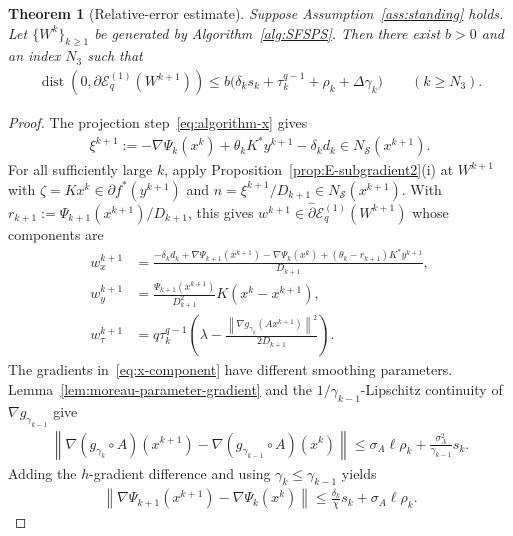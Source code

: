 \documentclass[9pt]{article}
\numberwithin{equation}{section}
\newtheorem{theorem}{Theorem}[section]
\theoremstyle{definition}
\theoremstyle{remark}
\newcommand{\Sset}{\mathcal S}
\newcommand{\whpartial}{\widehat\partial}
\newcommand{\norm}[1]{\left\lVert #1\right\rVert}
\newcommand{\Ecal}{\mathcal E}
\DeclareMathOperator{\dist}{dist}
\begin{document}
\begin{theorem}[Relative-error estimate]\label{lem:relative-error}
Suppose Assumption~\ref{ass:standing} holds. Let
$\{W^k\}_{k\geq1}$ be generated by Algorithm~\ref{alg:SFSPS}.
Then there exist $b>0$ and an index $N_3$ such that
\begin{eqnarray}\label{eq:corrected-relative-error}
 \dist\!\left(0,\partial\Ecal_q^{(1)}(W^{k+1})\right)
 \leq b\bigl(\delta_ks_k+\tau_k^{q-1}+\rho_k+\Delta\gamma_k\bigr)
 \qquad(k\geq N_3).
\end{eqnarray}
\end{theorem}
\begin{proof}
The projection step~\eqref{eq:algorithm-x} gives
\begin{eqnarray}\label{eq:projection-optimality}
 \xi^{k+1}:=-\nabla\Psi_k(x^k)+\theta_kK^*y^{k+1}-\delta_kd_k
 \in N_{\Sset}(x^{k+1}).
\end{eqnarray}
For all sufficiently large $k$, apply
Proposition~\ref{prop:E-subgradient2}(i) at $W^{k+1}$ with
$\zeta=Kx^k\in\partial f^*(y^{k+1})$ and
$n=\xi^{k+1}/D_{k+1}\in N_{\Sset}(x^{k+1})$.
 With
$r_{k+1}:=\Psi_{k+1}(x^{k+1})/D_{k+1}$, this gives
$w^{k+1}\in\whpartial\Ecal_q^{(1)}(W^{k+1})$ whose components are
\begin{align}
 w_x^{k+1}
 &=\frac{-\delta_kd_k+\nabla\Psi_{k+1}(x^{k+1})-\nabla\Psi_k(x^k)
              +(\theta_k-r_{k+1})K^*y^{k+1}}{D_{k+1}},
 \label{eq:x-component}\\
 w_y^{k+1}
 &=\frac{\Psi_{k+1}(x^{k+1})}{D_{k+1}^2}K(x^k-x^{k+1}),
 \label{eq:y-component}\\
 w_\tau^{k+1}
 &=q\tau_k^{q-1}\left(\lambda-
       \frac{\norm{\nabla g_{\gamma_k}(Ax^{k+1})}^2}{2D_{k+1}}\right).
 \label{eq:tau-component}
\end{align}
The gradients in~\eqref{eq:x-component} have different smoothing
parameters. Lemma~\ref{lem:moreau-parameter-gradient} and the
$1/\gamma_{k-1}$-Lipschitz continuity of $\nabla g_{\gamma_{k-1}}$ give
\begin{align}
\norm{\nabla(g_{\gamma_k}\circ A)(x^{k+1})
              -\nabla(g_{\gamma_{k-1}}\circ A)(x^k)}\leq\sigma_A\ell\rho_k
                 +\frac{\sigma_A^2}{\gamma_{k-1}}s_k.
 \label{eq:cross-parameter-gradient}
\end{align}
Adding the $h$-gradient difference and using
$\gamma_k\leq\gamma_{k-1}$ yields
\begin{eqnarray}\label{eq:cross-psi-gradient}
 \norm{\nabla\Psi_{k+1}(x^{k+1})-\nabla\Psi_k(x^k)}
 \leq\frac{\delta_k}{\chi}s_k+\sigma_A\ell\rho_k.
\end{eqnarray}


\end{proof}
\end{document}
